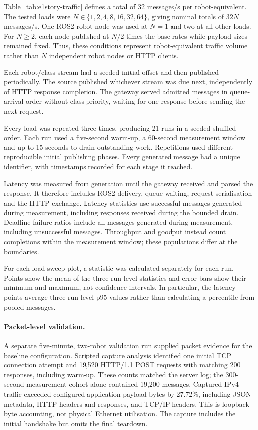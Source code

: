 Table~\ref{tab:e1story-traffic} defines a total of 32 messages/s per
robot-equivalent. The tested loads were
$N\in\{1,2,4,8,16,32,64\}$, giving nominal totals of $32N$ messages/s.
One ROS2 robot node was used at $N=1$ and two at all other loads.
For $N\geq2$, each node published at $N/2$ times the base rates while
payload sizes remained fixed. Thus, these conditions represent
robot-equivalent traffic volume rather than $N$ independent robot nodes
or HTTP clients.

Each robot/class stream had a seeded initial offset and then published
periodically. The source published whichever stream was due next,
independently of HTTP response completion. The gateway served admitted
messages in queue-arrival order without class priority, waiting for one
response before sending the next request.

Every load was repeated three times, producing 21 runs in a seeded
shuffled order. Each run used a five-second warm-up, a 60-second
measurement window and up to 15 seconds to drain outstanding work.
Repetitions used different reproducible initial publishing phases.
Every generated message had a unique identifier, with timestamps
recorded for each stage it reached.

Latency was measured from generation until the gateway received and
parsed the response. It therefore includes ROS2 delivery, queue waiting,
request serialisation and the HTTP exchange. Latency statistics use
successful messages generated during measurement, including responses
received during the bounded drain. Deadline-failure ratios include all
messages generated during measurement, including unsuccessful messages.
Throughput and goodput instead count completions within the measurement
window; these populations differ at the boundaries.

For each load-sweep plot, a statistic was calculated separately for
each run. Points show the mean of the three run-level statistics and
error bars show their minimum and maximum, not confidence intervals.
In particular, the latency points average three run-level p95 values
rather than calculating a percentile from pooled messages.

\paragraph{Packet-level validation.}
A separate five-minute, two-robot validation run supplied packet
evidence for the baseline configuration. Scripted capture analysis
identified one initial TCP connection attempt and 19,520 HTTP/1.1 POST
requests with matching 200 responses, including warm-up. These counts
matched the server log; the 300-second measurement cohort alone
contained 19,200 messages. Captured IPv4 traffic exceeded configured
application payload bytes by 27.72\%, including JSON metadata, HTTP
headers and responses, and TCP/IP headers. This is loopback byte
accounting, not physical Ethernet utilisation. The capture includes
the initial handshake but omits the final teardown.

